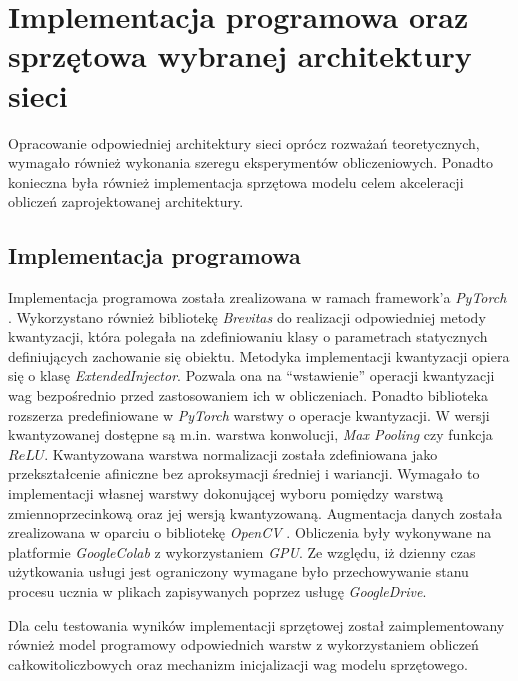 \chapter{Implementacja programowa oraz sprzętowa wybranej architektury sieci}
\label{cha:Implementacja}

Opracowanie odpowiedniej architektury sieci oprócz rozważań teoretycznych, wymagało również wykonania szeregu eksperymentów obliczeniowych.
Ponadto konieczna była również implementacja sprzętowa modelu celem akceleracji obliczeń zaprojektowanej architektury.

\section{Implementacja programowa}

Implementacja programowa została zrealizowana w ramach framework'a \emph{PyTorch} \cite{pytorch}.
Wykorzystano również bibliotekę \emph{Brevitas} \cite{brevitas} do realizacji odpowiedniej metody kwantyzacji, która polegała na zdefiniowaniu klasy o parametrach statycznych definiujących zachowanie się obiektu. 
Metodyka implementacji kwantyzacji opiera się o klasę \emph{ExtendedInjector}.
Pozwala ona na ``wstawienie'' operacji kwantyzacji wag bezpośrednio przed zastosowaniem ich w obliczeniach.
Ponadto biblioteka rozszerza predefiniowane w \emph{PyTorch} warstwy o operacje kwantyzacji. 
W wersji kwantyzowanej dostępne są m.in. warstwa konwolucji, \emph{Max Pooling} czy funkcja $ReLU$.
Kwantyzowana warstwa normalizacji została zdefiniowana jako przekształcenie afiniczne bez aproksymacji średniej i wariancji.
Wymagało to implementacji własnej warstwy dokonującej wyboru pomiędzy warstwą zmiennoprzecinkową oraz jej wersją kwantyzowaną.
Augmentacja danych została zrealizowana w oparciu o bibliotekę \emph{OpenCV} \cite{opencv}.
Obliczenia były wykonywane na platformie \emph{GoogleColab} \cite{colab} z wykorzystaniem \emph{GPU}.
Ze względu, iż dzienny czas użytkowania usługi jest ograniczony wymagane było przechowywanie stanu procesu ucznia w plikach zapisywanych poprzez usługę \emph{GoogleDrive}.

Dla celu testowania wyników implementacji sprzętowej został zaimplementowany również model programowy odpowiednich warstw z wykorzystaniem obliczeń całkowitoliczbowych oraz mechanizm inicjalizacji wag modelu sprzętowego.

